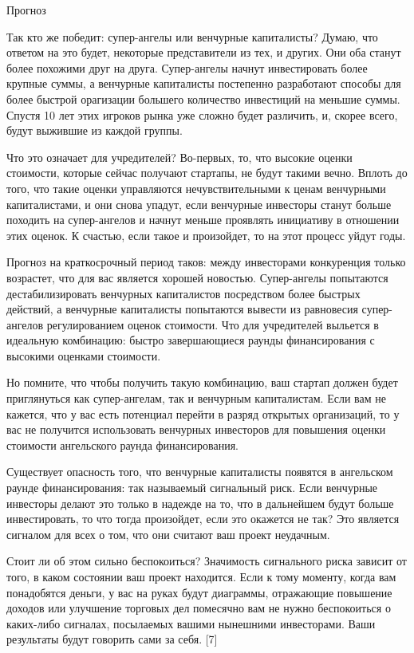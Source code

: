\documentclass[ebook,12pt,oneside,openany]{memoir}
\begin{document}
Прогноз

Так кто же победит: супер-ангелы или венчурные капиталисты? Думаю, что
ответом на это будет, некоторые представители из тех, и других. Они
оба станут более похожими друг на друга. Супер-ангелы начнут
инвестировать более крупные суммы, а венчурные капиталисты постепенно
разработают способы для более быстрой орагизации большего количество
инвестиций на меньшие суммы. Спустя 10 лет этих игроков рынка уже
сложно будет различить, и, скорее всего, будут выжившие из каждой
группы.

Что это означает для учредителей? Во-первых, то, что высокие оценки
стоимости, которые сейчас получают стартапы, не будут такими вечно.
Вплоть до того, что такие оценки управляются нечувствительными к ценам
венчурными капиталистами, и они снова упадут, если венчурные инвесторы
станут больше походить на супер-ангелов и начнут меньше проявлять
инициативу в отношении этих оценок. К счастью, если такое и
произойдет, то на этот процесс уйдут годы.

Прогноз на краткосрочный период таков: между инвесторами конкуренция
только возрастет, что для вас является хорошей новостью. Супер-ангелы
попытаются дестабилизировать венчурных капиталистов посредством более
быстрых действий, а венчурные капиталисты попытаются вывести из
равновесия супер-ангелов регулированием оценок стоимости. Что для
учредителей выльется в идеальную комбинацию: быстро завершающиеся
раунды финансирования с высокими оценками стоимости.

Но помните, что чтобы получить такую комбинацию, ваш стартап должен
будет приглянуться как супер-ангелам, так и венчурным капиталистам.
Если вам не кажется, что у вас есть потенциал перейти в разряд
открытых организаций, то у вас не получится использовать венчурных
инвесторов для повышения оценки стоимости ангельского раунда
финансирования.

Существует опасность того, что венчурные капиталисты появятся в
ангельском раунде финансирования: так называемый сигнальный риск. Если
венчурные инвесторы делают это только в надежде на то, что в
дальнейшем будут больше инвестировать, то что тогда произойдет, если
это окажется не так? Это является сигналом для всех о том, что они
считают ваш проект неудачным.

Стоит ли об этом сильно беспокоиться? Значимость сигнального риска
зависит от того, в каком состоянии ваш проект находится. Если к тому
моменту, когда вам понадобятся деньги, у вас на руках будут диаграммы,
отражающие повышение доходов или улучшение торговых дел помесячно вам
не нужно беспокоиться о каких-либо сигналах, посылаемых вашими
нынешними инвесторами. Ваши результаты будут говорить сами за себя.
[7]
\end{document}
